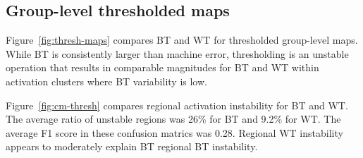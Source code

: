 \documentclass[conference]{IEEEtran}
\begin{document}
  
  \begin{figure}[ht]
  \end{figure}


  \subsection{Group-level thresholded maps}

  Figure~\ref{fig:thresh-maps} compares BT and WT for thresholded group-level maps.
  While BT is consistently larger than machine error, thresholding is an unstable operation 
  that results in comparable magnitudes for BT and WT within activation clusters where BT variability is low. 

  Figure~\ref{fig:cm-thresh} compares regional activation instability for BT and WT. The average ratio
  of unstable regions was 26\% for BT and 9.2\% for WT. The average F1 score in these confusion matrics was 0.28. Regional 
  WT instability appears to moderately explain BT regional BT instability.
  
\end{document}
